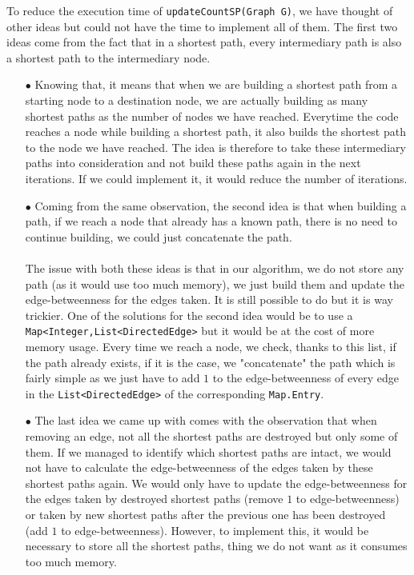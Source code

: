 \documentclass{article}
\begin{document}
To reduce the execution time of \texttt{updateCountSP(Graph G)}, we have thought of other ideas but could not have the time to implement all of them. The first two ideas come from the fact that in a shortest path, every intermediary path is also a shortest path to the intermediary node.
\begin{itemize}
\item[$\bullet$] Knowing that, it means that when we are building a shortest path from a starting node to a destination node, we are actually building as many shortest paths as the number of nodes we have reached. Everytime the code reaches a node while building a shortest path, it also builds the shortest path to the node we have reached. The idea is therefore to take these intermediary paths into consideration and not build these paths again in the next iterations. If we could implement it, it would reduce the number of iterations.
\item[$\bullet$] Coming from the same observation, the second idea is that when building a path, if we reach a node that already has a known path, there is no need to continue building, we could just concatenate the path. \\ \\
The issue with both these ideas is that in our algorithm, we do not store any path (as it would use too much memory), we just build them and update the edge-betweenness for the edges taken. It is still possible to do but it is way trickier. One of the solutions for the second idea would be to use a \texttt{Map<Integer,List<DirectedEdge>} but it would be at the cost of more memory usage. Every time we reach a node, we check, thanks to this list, if the path already exists, if it is the case, we "concatenate" the path which is fairly simple as we just have to add $1$ to the edge-betweenness of every edge in the \texttt{List<DirectedEdge>} of the corresponding \texttt{Map.Entry}.
\item[$\bullet$] The last idea we came up with comes with the observation that when removing an edge, not all the shortest paths are destroyed but only some of them. If we managed to identify which shortest paths are intact, we would not have to calculate the edge-betweenness of the edges taken by these shortest paths again. We would only have to update the edge-betweenness for the edges taken by destroyed shortest paths (remove $1$ to edge-betweenness) or taken by new shortest paths after the previous one has been destroyed (add $1$ to edge-betweenness). However, to implement this, it would be necessary to store all the shortest paths, thing we do not want as it consumes too much memory.
\end{itemize}
\end{document}
